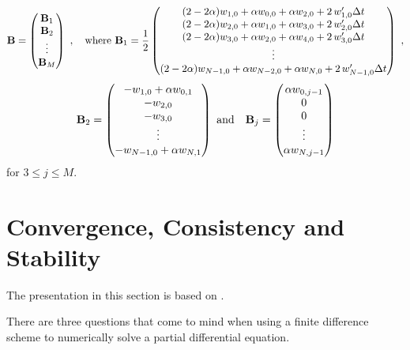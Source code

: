 \[
\VEC{B} = \begin{pmatrix} \VEC{B}_1 \\ \VEC{B}_2 \\ \vdots \\
\VEC{B}_M \end{pmatrix} \ , \quad \text{where} \ 
\VEC{B}_1 = \frac{1}{2} \begin{pmatrix}
(2-2\alpha) w_{1,0} + \alpha w_{0,0} + \alpha w_{2,0}
+ 2\,w_{1,0}' \dtx{t} \\
(2-2\alpha)w_{2,0} + \alpha w_{1,0} + \alpha w_{3,0}
+ 2\,w_{2,0}' \dtx{t} \\
(2-2\alpha)w_{3,0} + \alpha w_{2,0} + \alpha w_{4,0}
+ 2\,w_{3,0}' \dtx{t} \\
\vdots \\
(2-2\alpha)w_{N-1,0} + \alpha w_{N-2,0} + \alpha w_{N,0}
+ 2\,w_{N-1,0}' \dtx{t} \\
\end{pmatrix} \ ,
\]
\[
\mathbf{B}_2 = \begin{pmatrix}
-w_{1,0} + \alpha w_{0,1}\\
-w_{2,0} \\
-w_{3,0} \\
\vdots \\
-w_{N-1,0} + \alpha w_{N,1} \\
\end{pmatrix}
\ \text{and} \quad
\mathbf{B}_j = \begin{pmatrix}
\alpha w_{0,j-1}\\
0\\
0\\
\vdots \\
\alpha w_{N,j-1}
\end{pmatrix}
\]
for $3 \leq j \leq M$.

\section{Convergence, Consistency and Stability} \label{fdm_CCS}

The presentation in this section is based on \cite{IK,WH,I}.

There are three questions that come to mind when using a finite
difference scheme to numerically solve a partial differential equation.

